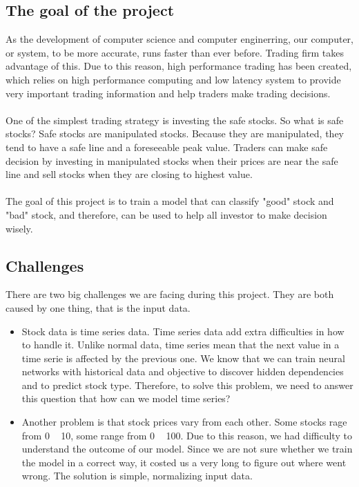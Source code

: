 \documentclass[prodmode,acmtecs]{acmsmall} %
\begin{document}
\subsection{The goal of the project}
As the development of computer science and computer enginerring, our computer, or 
system, to be more accurate, runs faster than ever before. Trading firm takes advantage of 
this. Due to this reason, high performance trading has been created, which relies on high 
performance computing and low latency system to provide very important trading information 
and help traders make trading decisions. \\\\
One of the simplest trading strategy is investing the safe stocks. So what is safe stocks? 
Safe stocks are manipulated stocks. Because they are manipulated, they tend to have a safe line 
and a foreseeable peak value. Traders can make safe decision by investing in manipulated stocks 
when their prices are near the safe line and sell stocks when they are closing to highest value. \\\\
The goal of this project is to train a model that can classify "good" stock and "bad" stock, and therefore, 
can be used to help all investor to make decision wisely.

\subsection{Challenges}
There are two big challenges we are facing during this project. They are both caused by one thing,
that is the input data. 

\begin{itemize}
\item Stock data is time series data. Time series data add extra 
difficulties in how to handle it. Unlike normal data, time series mean that the next 
value in a time serie is affected by the previous one. We know that we can train 
neural networks with historical data and objective to discover hidden dependencies and 
to predict stock type. Therefore, to solve this problem, we need to answer this question 
that how can we model time series?
\item Another problem is that stock prices vary from each other. Some stocks rage from 
0 ~ 10, some range from 0 ~ 100. Due to this reason, we had difficulty to understand the outcome 
of our model. Since we are not sure whether we train the model in a correct way, it costed us a very 
long to figure out where went wrong. The solution is simple, normalizing input data.
\end{itemize}
\end{document}
